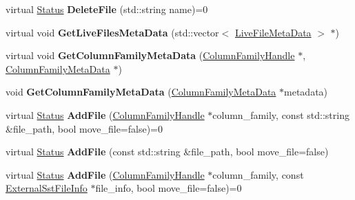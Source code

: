 \begin{DoxyCompactItemize}
\item 
virtual \hyperlink{classrocksdb_1_1Status}{Status} {\bfseries Delete\+File} (std\+::string name)=0\hypertarget{classrocksdb_1_1DB_a04985803f9914f80a9f4bdd894771e2b}{}\label{classrocksdb_1_1DB_a04985803f9914f80a9f4bdd894771e2b}

\item 
virtual void {\bfseries Get\+Live\+Files\+Meta\+Data} (std\+::vector$<$ \hyperlink{structrocksdb_1_1LiveFileMetaData}{Live\+File\+Meta\+Data} $>$ $\ast$)\hypertarget{classrocksdb_1_1DB_ae7d0a66cc4f4e08e6df31db2aa48aebe}{}\label{classrocksdb_1_1DB_ae7d0a66cc4f4e08e6df31db2aa48aebe}

\item 
virtual void {\bfseries Get\+Column\+Family\+Meta\+Data} (\hyperlink{classrocksdb_1_1ColumnFamilyHandle}{Column\+Family\+Handle} $\ast$, \hyperlink{structrocksdb_1_1ColumnFamilyMetaData}{Column\+Family\+Meta\+Data} $\ast$)\hypertarget{classrocksdb_1_1DB_a0d0c02b96ac8ac35c49bf00f4ddd0021}{}\label{classrocksdb_1_1DB_a0d0c02b96ac8ac35c49bf00f4ddd0021}

\item 
void {\bfseries Get\+Column\+Family\+Meta\+Data} (\hyperlink{structrocksdb_1_1ColumnFamilyMetaData}{Column\+Family\+Meta\+Data} $\ast$metadata)\hypertarget{classrocksdb_1_1DB_a90f405c1bdced4252d8e9fd9925b95b4}{}\label{classrocksdb_1_1DB_a90f405c1bdced4252d8e9fd9925b95b4}

\item 
virtual \hyperlink{classrocksdb_1_1Status}{Status} {\bfseries Add\+File} (\hyperlink{classrocksdb_1_1ColumnFamilyHandle}{Column\+Family\+Handle} $\ast$column\+\_\+family, const std\+::string \&file\+\_\+path, bool move\+\_\+file=false)=0\hypertarget{classrocksdb_1_1DB_af02d75b05154cbb1c1fa9dcad88c26ef}{}\label{classrocksdb_1_1DB_af02d75b05154cbb1c1fa9dcad88c26ef}

\item 
virtual \hyperlink{classrocksdb_1_1Status}{Status} {\bfseries Add\+File} (const std\+::string \&file\+\_\+path, bool move\+\_\+file=false)\hypertarget{classrocksdb_1_1DB_afd2b59898d904dde210f9ab174af6bd2}{}\label{classrocksdb_1_1DB_afd2b59898d904dde210f9ab174af6bd2}

\item 
virtual \hyperlink{classrocksdb_1_1Status}{Status} {\bfseries Add\+File} (\hyperlink{classrocksdb_1_1ColumnFamilyHandle}{Column\+Family\+Handle} $\ast$column\+\_\+family, const \hyperlink{structrocksdb_1_1ExternalSstFileInfo}{External\+Sst\+File\+Info} $\ast$file\+\_\+info, bool move\+\_\+file=false)=0\hypertarget{classrocksdb_1_1DB_a41c3fb74e6f0ac69c4fc8f475384f4b1}{}\label{classrocksdb_1_1DB_a41c3fb74e6f0ac69c4fc8f475384f4b1}


\end{DoxyCompactItemize}
